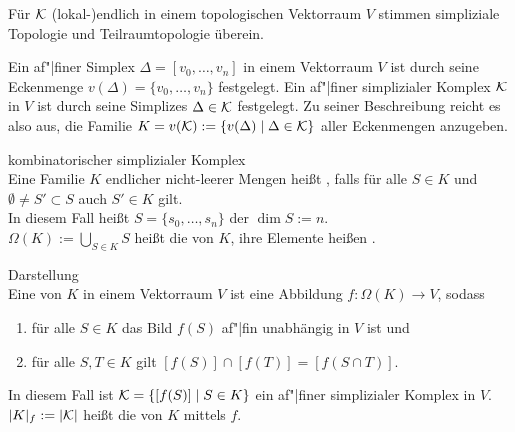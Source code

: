 \begin{Bem}
    Für $\mathcal{K}$ (lokal-)endlich in einem topologischen Vektorraum $V$ stimmen
    simpliziale Topologie und Teilraumtopologie überein.
\end{Bem}

\linie

\begin{Bem}
    Ein af"|finer Simplex $\Delta = [v_0, \dotsc, v_n]$ in einem Vektorraum $V$
    ist durch seine Eckenmenge $v(\Delta) = \{v_0, \dotsc, v_n\}$ festgelegt.
    Ein af"|finer simplizialer Komplex $\mathcal{K}$ in $V$ ist durch seine Simplizes
    $\Delta \in \mathcal{K}$ festgelegt.
    Zu seiner Beschreibung reicht es also aus, die Familie
    $K = v(\mathcal{K}) := \{v(\Delta) \;|\; \Delta \in \mathcal{K}\}$
    aller Eckenmengen anzugeben.
\end{Bem}

\begin{Def}{kombinatorischer simplizialer Komplex}\\
    Eine Familie $K$ endlicher nicht-leerer Mengen heißt
    ,
    falls für alle $S \in K$ und $\emptyset \not= S' \subset S$ auch
    $S' \in K$ gilt. \\
    In diesem Fall heißt $S = \{s_0, \dotsc, s_n\}$
    der  $\dim S := n$. \\
    $\Omega(K) := \bigcup_{S \in K} S$ heißt die  von $K$,
    ihre Elemente heißen .
\end{Def}

\linie

\begin{Def}{Darstellung}\\
    Eine  von $K$ in einem Vektorraum $V$ ist
    eine Abbildung $f\colon \Omega(K) \rightarrow V$, sodass
    \begin{enumerate}
        \item
        für alle $S \in K$ das Bild $f(S)$ af"|fin unabhängig in $V$ ist und
        
        \item
        für alle $S, T \in K$ gilt $[f(S)] \cap [f(T)] = [f(S \cap T)]$.
    \end{enumerate}
    In diesem Fall ist $\mathcal{K} = \{[f(S)] \;|\; S \in K\}$
    ein af"|finer simplizialer Komplex in $V$. \\
    $|K|_f := |\mathcal{K}|$ heißt die  von $K$
    mittels $f$.
\end{Def}

